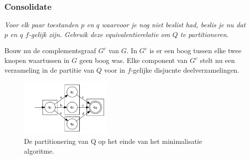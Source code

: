 \documentclass[main.tex]{subfiles}
\begin{document}
\begin{al}
  \subsubsection{Consolidate}
  \textit{
    Voor elk paar toestanden $p$ en $q$ waarvoor je nog niet beslist had, beslis je nu dat $p$ en $q$ $f$-gelijk zijn.
    Gebruik deze equivalentierelatie om $Q$ te partitioneren.
  }  

  Bouw nu de complementsgraaf $G^{c}$ van $G$.
  In $G^{c}$ is er een boog tussen elke twee knopen waartussen in $G$ geen boog was.
  Elke component van $G^{c}$ stelt nu een verzameling in de partitie van $Q$ voor in $f$-gelijke disjucnte deelverzamelingen.

  \begin{figure}[H]
    \centering
    \includegraphics[width=0.4\textwidth]{assets/dfa_minimalisatie-5.png}     
    \caption{De partitionering van Q op het einde van het minimalisatie algoritme.}
    \label{fig:dfa-minimalisatie-5}
  \end{figure}

\end{al}
\end{document}
